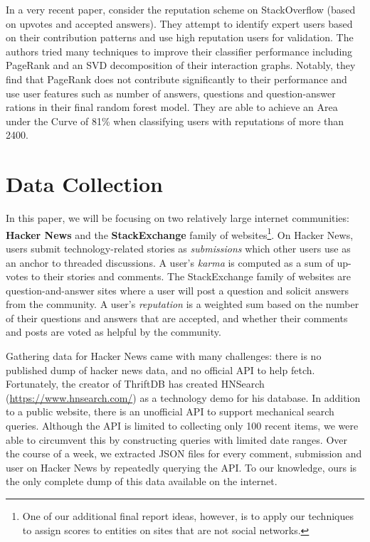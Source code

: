 \documentclass[10pt]{article}
\begin{document}
In a very recent paper, \citet{movshovitzanalysis} consider the reputation
scheme on StackOverflow (based on upvotes and accepted answers). They 
attempt to identify expert users based on their contribution
patterns and use high reputation users for validation. The authors tried many 
techniques to improve their classifier performance including PageRank and
an SVD decomposition of their interaction graphs. Notably, they find
that PageRank does not contribute significantly to their performance
and use user features such as number of answers, questions and question-answer 
rations in their final random forest model. They are
able to achieve an Area under the Curve of 81\% when classifying users
with reputations of more than 2400.

\section{Data Collection}

In this paper, we will be focusing on two relatively large internet communities:
\textbf{Hacker News} and the \textbf{StackExchange} family of
websites\footnote{One of our additional final report ideas, however, is to apply
  our techniques to assign scores to entities on sites that are not social
networks.}. On Hacker News, users submit technology-related stories as
\textit{submissions} which other users use as an anchor to threaded discussions.
A user's \textit{karma} is computed as a sum of up-votes to their stories and
comments.  The StackExchange family of websites are question-and-answer sites
where a user will post a question and solicit answers from the community. A
user's \textit{reputation} is a weighted sum based on the number of their
questions and answers that are accepted, and whether their comments and posts
are voted as helpful by the community.

Gathering data for Hacker News came with many challenges: there is no published
dump of hacker news data, and no official API to help fetch. Fortunately, the creator
of ThriftDB has created HNSearch (\url{https://www.hnsearch.com/}) as a technology
demo for his database. In addition to a public website, there is an unofficial API
to support mechanical search queries. Although the API is limited to collecting 
only 100 recent items, we were able to circumvent this by constructing queries with limited
date ranges. Over the course of a week, we extracted JSON files for every comment,
submission and user on Hacker News by repeatedly querying the API\@. To our knowledge,
ours is the only complete dump of this data available on the internet.
\end{document}
